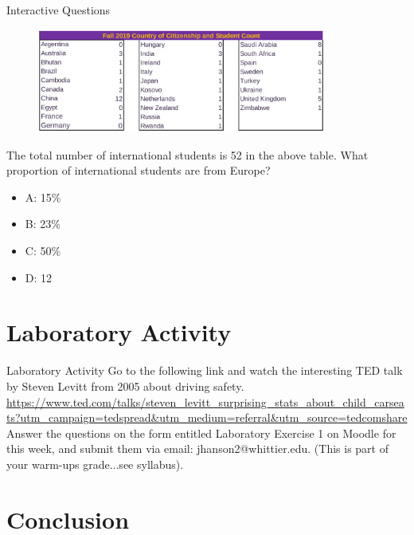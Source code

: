 \documentclass{beamer}
\begin{document}
\begin{frame}{Interactive Questions}
\begin{figure}
\centering
\includegraphics[width=0.85\textwidth]{figures/map.png}
\end{figure}
The total number of international students is 52 in the above table.  What proportion of international students are from Europe?
\begin{itemize}
\item A: 15\%
\item B: 23\%
\item C: 50\%
\item D: 12
\end{itemize}
\end{frame}

\section{Laboratory Activity}

\begin{frame}{Laboratory Activity}
Go to the following link and watch the interesting TED talk by Steven Levitt from 2005 about driving safety. \\ \vspace{1cm}
\url{https://www.ted.com/talks/steven_levitt_surprising_stats_about_child_carseats?utm_campaign=tedspread&utm_medium=referral&utm_source=tedcomshare} \\ \vspace{1cm}
Answer the questions on the form entitled \alert{Laboratory Exercise 1} on Moodle for this week, and submit them via email: jhanson2@whittier.edu. (This is part of your warm-ups grade...see syllabus).
\end{frame}

\section{Conclusion}
\end{document}
